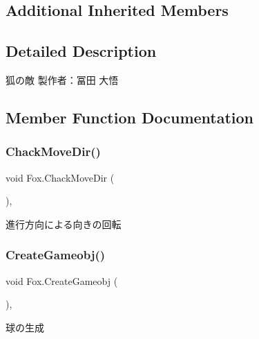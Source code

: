 \subsection*{Additional Inherited Members}


\subsection{Detailed Description}
狐の敵 製作者：冨田 大悟 



\subsection{Member Function Documentation}
\mbox{\label{class_fox_a30e7733158c33fef25ae243aa45d6de4}} 
\subsubsection{\texorpdfstring{Chack\+Move\+Dir()}{ChackMoveDir()}}
{\footnotesize\ttfamily void Fox.\+Chack\+Move\+Dir (\begin{DoxyParamCaption}{ }\end{DoxyParamCaption})\hspace{0.3cm}{\ttfamily [inline]}, {\ttfamily [private]}}



進行方向による向きの回転 

\mbox{\label{class_fox_a0b6f885799c2ab94dd5e12db47ccd2f2}} 
\subsubsection{\texorpdfstring{Create\+Gameobj()}{CreateGameobj()}}
{\footnotesize\ttfamily void Fox.\+Create\+Gameobj (\begin{DoxyParamCaption}{ }\end{DoxyParamCaption})\hspace{0.3cm}{\ttfamily [inline]}, {\ttfamily [private]}}



球の生成 

\mbox{\label{class_fox_a34985f75859d53cd02305e84dfa8a058}} 
